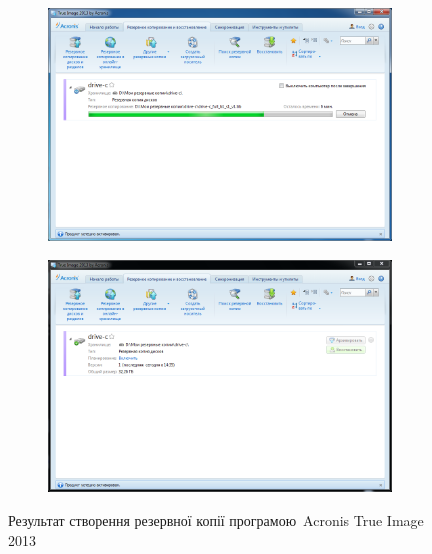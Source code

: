 \documentclass[
	a4paper,
	oneside,
	DIV = 12,
	fontsize = 13pt,
	headings = normal,
]{scrartcl}
\begin{document}
			\begin{figure}[!htbp]
				\centering
				\begin{subfigure}{0.5\columnwidth}
					\centering
					\includegraphics[height = 8\baselineskip]{./assets/y03s01-pcdiag-lab-04-p01.png}
					\caption{}
					\label{subfig:01-01}
				\end{subfigure}%
				\begin{subfigure}{0.5\columnwidth}
					\centering
					\includegraphics[height = 8\baselineskip]{./assets/y03s01-pcdiag-lab-04-p02.png}
					\caption{}
					\label{subfig:01-02}
				\end{subfigure}%
				\caption{Результат створення резервної копії програмою~\textenglish{Acronis True Image 2013}}
				\label{fig:01-acronis-true-image-res}
			\end{figure}
\end{document}
